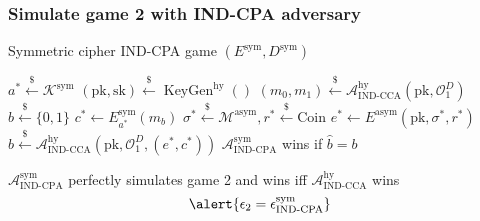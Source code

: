 \documentclass{beamer}
\newcommand{\leftsample}{\overset{{\scriptscriptstyle\$}}{\leftarrow}}
\begin{document}
\begin{frame}
    \frametitle{Simulate game 2 with IND-CPA adversary}

    \begin{algorithm}[H]
    \SetAlgoLined
    \caption{Symmetric cipher IND-CPA game $(E^\text{sym}, D^\text{sym})$}
    $a^\ast \leftsample \mathcal{K}^\text{sym}$\;
    $(\text{pk}, \text{sk}) \leftsample \operatorname{KeyGen}^\text{hy}()$\;
    $(m_0, m_1) \leftsample \mathcal{A}^\text{hy}_\text{IND-CCA}(
        \text{pk}, \mathcal{O}^D_1
    )$\;
    $b \leftsample \{0, 1\}$\;
    $c^\ast \leftarrow E^\text{sym}_{a^\ast}(m_b)$\;
    $
        \sigma^\ast \leftsample \mathcal{M}^\text{asym},
        r^\ast \leftsample \text{Coin}
    $
    \;
    $e^\ast \leftarrow E^\text{asym}(\text{pk}, \sigma^\ast, r^\ast)$\;
    $
        \hat{b} \leftsample \mathcal{A}^\text{hy}_\text{IND-CCA}(
            \text{pk}, \mathcal{O}^D_1, (e^\ast, c^\ast)
        )
    $\;
    $\mathcal{A}^\text{sym}_\text{IND-CPA}$ wins if $\hat{b} = b$
    \end{algorithm}

    $\mathcal{A}^\text{sym}_\text{IND-CPA}$ perfectly simulates game 2 and wins iff $\mathcal{A}^\text{hy}_\text{IND-CCA}$ wins
    \begin{equation*}
        \alert{
            \epsilon_2 = \epsilon^\text{sym}_\text{IND-CPA}
        }
    \end{equation*}

\end{frame}
\end{document}
